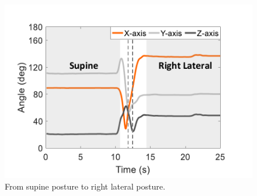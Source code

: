 \begin{figure}[!t]
\begin{minipage}[t]{0.31\linewidth}
    \includegraphics[width=0.97\linewidth]{Figures/SupineToRight.pdf}
  \caption{From supine posture to right lateral posture.}\label{fig:SupineToRight}
\end{minipage}
\end{figure}

